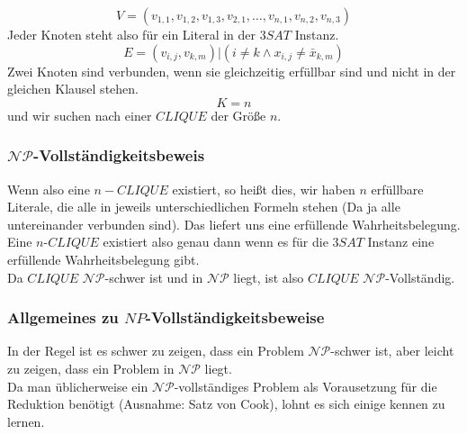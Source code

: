 \documentclass{beamer}
\begin{document}
{\begin{frame}
$$V = (v_{1,1}, v_{1,2}, v_{1,3}, v_{2,1},\ldots,v_{n,1},v_{n,2},v_{n,3})$$
Jeder Knoten steht also für ein Literal in der $3SAT$ Instanz. 
$$E = {(v_{i,j},v_{k,m})| (i \neq k \wedge x_{i,j} \neq \bar{x}_{k,m} )}$$%
Zwei Knoten sind verbunden, wenn sie gleichzeitig erfüllbar sind und nicht in der gleichen Klausel stehen. 
$$K = n$$
und wir suchen nach einer $CLIQUE$ der Größe $n$.\\
\end{frame}
\begin{frame}
\frametitle{$\mathcal{NP}$-Vollständigkeitsbeweis}
Wenn also eine $n-CLIQUE$ existiert, so heißt dies, wir haben $n$ erfüllbare Literale, die alle in jeweils unterschiedlichen Formeln stehen (Da ja alle untereinander verbunden sind). Das liefert uns eine erfüllende Wahrheitsbelegung. Eine $n$-$CLIQUE$ existiert also genau dann wenn es für die $3SAT$ Instanz eine erfüllende Wahrheitsbelegung gibt.\\
Da $CLIQUE$ $\mathcal{NP}$-schwer ist und in $\mathcal{NP}$ liegt, ist also $CLIQUE$ $\mathcal{NP}$-Vollständig.
\end{frame}

\begin{frame}
\frametitle{Allgemeines zu $NP$-Vollständigkeitsbeweise}
In der Regel ist es schwer zu zeigen, dass ein Problem $\mathcal{NP}$-schwer ist, aber leicht zu zeigen, dass ein Problem in $\mathcal{NP}$ liegt.\\[8pt]
Da man üblicherweise ein $\mathcal{NP}$-vollständiges Problem als Vorausetzung für die Reduktion benötigt (Ausnahme: Satz von Cook), lohnt es sich einige kennen zu lernen.
\end{frame}

}
\end{document}
